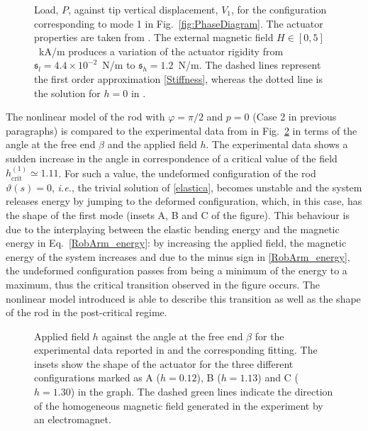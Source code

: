 \documentclass[oneside]{article}
\begin{document}
			\begin{figure}[h]
				\begin{center}
					\begin{tiny}
						\def\svgwidth{.6\textwidth}
						
					\end{tiny}
					\caption{Load, $P$, against tip vertical displacement, $V_1$, for the configuration corresponding to mode 1 in Fig.~\ref{fig:PhaseDiagram}. The actuator properties are taken from \cite{Stanier2016}. The external magnetic field $H\in\left[0,5\right]$~kA/m produces a variation of the actuator rigidity from $\mathfrak{s}_l=4.4\times 10^{-2}$~N/m to $\mathfrak{s}_h=1.2$~N/m. The dashed lines represent the first order approximation \eqref{Stiffness}, whereas the dotted line is the solution for $h=0$ in \cite{Levyakov2010}.\vspace{-0.7cm}}
					\label{fig:stiffness}
				\end{center}
			\end{figure}
			
			The nonlinear model of the rod with $\varphi=\pi/2$ and $p=0$ (Case 2 in previous paragraphs) is compared to the experimental data from \cite{Stanier2016} in Fig.~\ref{fig:fitting} in terms of the angle at the free end $\beta$ and the applied field $h$. The experimental data shows a sudden increase in the angle in correspondence of a critical value of the field $h_\text{crit}^{(1)}\simeq 1.11$. For such a value, the undeformed configuration of the rod $\vartheta(s)=0$, \textit{i.e.}, the trivial solution of \eqref{elastica}, becomes unstable and the system releases energy by jumping to the deformed configuration, which, in this case, has the shape of the first mode (insets A, B and C of the figure). This behaviour is due to the interplaying between the elastic bending energy and the magnetic energy in Eq.~\eqref{RobArm_energy}: by increasing the applied field, the magnetic energy of the system increases and due to the minus sign in \eqref{RobArm_energy}, the undeformed configuration passes from being a minimum of the energy to a maximum, thus the critical transition observed in the figure occurs. The nonlinear model introduced is able to describe this transition as well as the shape of the rod in the post-critical regime.
			
			\begin{figure}
				\begin{center}
					\begin{tiny}
						\def\svgwidth{1\textwidth}
						
					\end{tiny}
					\caption{Applied field $h$ against the angle at the free end $\beta$ for the experimental data reported in \cite{Stanier2016} and the corresponding fitting. The insets show the shape of the actuator for the three different configurations marked as A ($h=0.12$), B ($h=1.13$) and C ($h=1.30$) in the graph. The dashed green lines indicate the direction of the homogeneous magnetic field generated in the experiment by an electromagnet.\vspace{-1cm}}
					\label{fig:fitting}
				\end{center}
			\end{figure}
			
\end{document}
